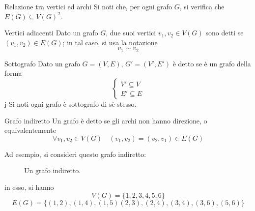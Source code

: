 \documentclass[a4paper, 12pt]{report}
\begin{document}
    \begin{framedobs}{Relazione tra vertici ed archi}
        Si noti che, per ogni grafo $G$, si verifica che $E(G) \subseteq V(G)^2$.
    \end{framedobs}

    \begin{frameddefn}{Vertici adiacenti}
        Dato un grafo $G$, due suoi vertici $v_1, v_2 \in V(G)$ sono detti  se $(v_1, v_2) \in E(G)$; in tal caso, si usa la notazione $$v_1 \sim v_2$$
    \end{frameddefn}

    \begin{frameddefn}{Sottografo}
        Dato un grafo $G = (V, E)$, $G'=(V', E')$ è detto  se è un grafo della forma $$\left \{ \begin{array}{l} V' \subseteq V \\ E' \subseteq E \end{array} \right.$$j Si noti ogni grafo è sottografo di sè stesso.
    \end{frameddefn}

    \begin{frameddefn}{Grafo indiretto}
        Un grafo è detto  se gli archi non hanno direzione, o equivalentemente $$\forall v_1, v_2 \in V(G) \quad (v_1, v_2) = (v_2, v_1) \in E(G)$$
    \end{frameddefn}

    \begin{example}
        Ad esempio, si consideri questo grafo indiretto:

        \begin{figure}[H]
            \centering
            \caption{Un grafo indiretto.}
        \end{figure}

        in esso, si hanno $$V(G) = \{1, 2, 3, 4, 5, 6\}$$ $$E(G) = \{(1, 2), (1, 4), (1, 5) (2, 3), (2, 4), (3, 4), (3, 6), (5, 6)\}$$
    \end{example}
\end{document}
